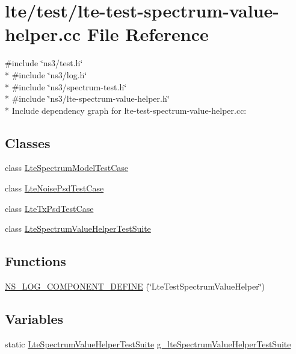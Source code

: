\hypertarget{lte-test-spectrum-value-helper_8cc}{}\section{lte/test/lte-\/test-\/spectrum-\/value-\/helper.cc File Reference}
\label{lte-test-spectrum-value-helper_8cc}
{\ttfamily \#include \char`\"{}ns3/test.\+h\char`\"{}}\\*
{\ttfamily \#include \char`\"{}ns3/log.\+h\char`\"{}}\\*
{\ttfamily \#include \char`\"{}ns3/spectrum-\/test.\+h\char`\"{}}\\*
{\ttfamily \#include \char`\"{}ns3/lte-\/spectrum-\/value-\/helper.\+h\char`\"{}}\\*
Include dependency graph for lte-\/test-\/spectrum-\/value-\/helper.cc\+:
\subsection*{Classes}
\begin{DoxyCompactItemize}
\item 
class \hyperlink{classLteSpectrumModelTestCase}{Lte\+Spectrum\+Model\+Test\+Case}
\item 
class \hyperlink{classLteNoisePsdTestCase}{Lte\+Noise\+Psd\+Test\+Case}
\item 
class \hyperlink{classLteTxPsdTestCase}{Lte\+Tx\+Psd\+Test\+Case}
\item 
class \hyperlink{classLteSpectrumValueHelperTestSuite}{Lte\+Spectrum\+Value\+Helper\+Test\+Suite}
\end{DoxyCompactItemize}
\subsection*{Functions}
\begin{DoxyCompactItemize}
\item 
\hyperlink{lte-test-spectrum-value-helper_8cc_a4e6e7e657b97b74fe12fd084c8073caf}{N\+S\+\_\+\+L\+O\+G\+\_\+\+C\+O\+M\+P\+O\+N\+E\+N\+T\+\_\+\+D\+E\+F\+I\+NE} (\char`\"{}Lte\+Test\+Spectrum\+Value\+Helper\char`\"{})
\end{DoxyCompactItemize}
\subsection*{Variables}
\begin{DoxyCompactItemize}
\item 
static \hyperlink{classLteSpectrumValueHelperTestSuite}{Lte\+Spectrum\+Value\+Helper\+Test\+Suite} \hyperlink{lte-test-spectrum-value-helper_8cc_a2c0cdf3c1d3437d35f468de9d234c2c2}{g\+\_\+lte\+Spectrum\+Value\+Helper\+Test\+Suite}
\end{DoxyCompactItemize}


